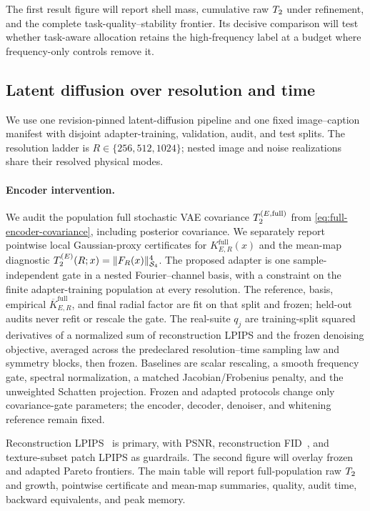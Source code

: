 The first result figure will report shell mass, cumulative raw $T_2$ under
refinement, and the complete task-quality--stability frontier. Its decisive
comparison will test whether task-aware allocation retains the high-frequency
label at a budget where frequency-only controls remove it.


\subsection{Latent diffusion over resolution and time}
\label{sec:exp-real-suite}

We use one revision-pinned latent-diffusion pipeline and one fixed
image--caption manifest with disjoint adapter-training, validation, audit, and
test splits. The resolution ladder is $R\in\{256,512,1024\}$; nested image and
noise realizations share their resolved physical modes.

\paragraph{Encoder intervention.}
We audit the population full stochastic VAE covariance
$T_2^{(E,\mathrm{full})}$ from \cref{eq:full-encoder-covariance}, including
posterior covariance. We separately report pointwise local Gaussian-proxy
certificates for $K_{E,R}^{\mathrm{full}}(x)$ and the mean-map diagnostic
$T_2^{(E)}(R;x)=\lVert F_R(x)\rVert_{\mathcal{S}_{4}}^4$. The proposed
adapter is one sample-independent gate in a nested Fourier--channel basis, with
a constraint on the finite adapter-training population at every resolution.
The reference, basis, empirical $\overline K_{E,R}^{\mathrm{full}}$, and final
radial factor are fit on that split and frozen; held-out audits never refit or
rescale the gate. The real-suite $q_j$ are training-split squared derivatives of
a normalized sum of reconstruction LPIPS and the frozen denoising objective,
averaged across the predeclared resolution--time sampling law and symmetry
blocks, then frozen.
Baselines are scalar rescaling, a smooth frequency gate, spectral
normalization, a matched Jacobian/Frobenius penalty, and the unweighted Schatten
projection. Frozen and adapted protocols change only covariance-gate
parameters; the encoder, decoder, denoiser, and whitening reference remain
fixed.

Reconstruction LPIPS~\citep{zhang2018perceptual} is primary, with PSNR,
reconstruction FID~\citep{heusel2017gans}, and texture-subset patch LPIPS as
guardrails. The second figure will overlay frozen and adapted Pareto frontiers.
The main table will report full-population raw $T_2$ and growth, pointwise
certificate and mean-map summaries, quality, audit time, backward equivalents,
and peak memory.

